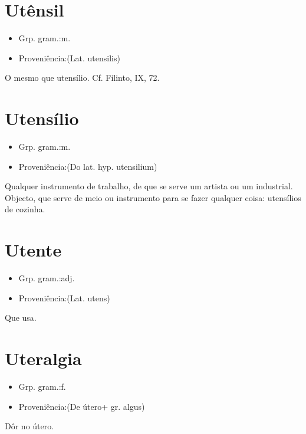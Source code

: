 \documentclass{article}
\begin{document}
\section{Utênsil}
\begin{itemize}
\item {Grp. gram.:m.}
\end{itemize}
\begin{itemize}
\item {Proveniência:(Lat. \textunderscore utensilis\textunderscore )}
\end{itemize}
O mesmo que \textunderscore utensílio\textunderscore . Cf. Filinto, IX, 72.
\section{Utensílio}
\begin{itemize}
\item {Grp. gram.:m.}
\end{itemize}
\begin{itemize}
\item {Proveniência:(Do lat. hyp. \textunderscore utensilium\textunderscore )}
\end{itemize}
Qualquer instrumento de trabalho, de que se serve um artista ou um industrial.
Objecto, que serve de meio ou instrumento para se fazer qualquer coisa: \textunderscore utensílios de cozinha\textunderscore .
\section{Utente}
\begin{itemize}
\item {Grp. gram.:adj.}
\end{itemize}
\begin{itemize}
\item {Proveniência:(Lat. \textunderscore utens\textunderscore )}
\end{itemize}
Que usa.
\section{Uteralgia}
\begin{itemize}
\item {Grp. gram.:f.}
\end{itemize}
\begin{itemize}
\item {Proveniência:(De \textunderscore útero\textunderscore  + gr. \textunderscore algus\textunderscore )}
\end{itemize}
Dôr no útero.
\end{document}
